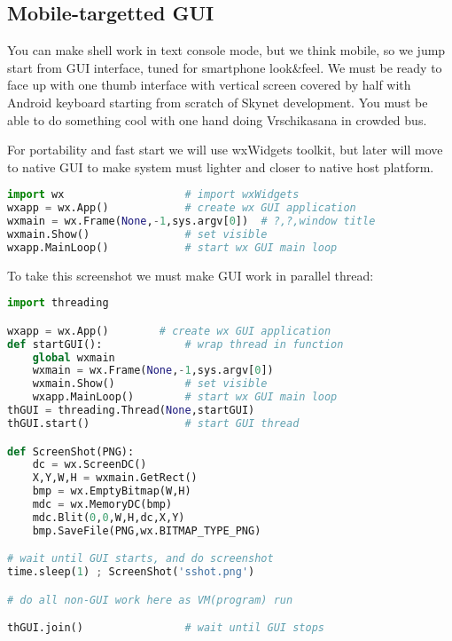 \clearpage
\subsection{Mobile-targetted GUI}
You can make shell work in text console mode, but we think mobile, so we jump
start from GUI interface, tuned for smartphone look\&feel. We must be ready to
face up with one thumb interface with vertical screen covered by half
with Android keyboard starting from scratch of Skynet development. You must be
able to do something cool with one hand doing Vrschikasana in crowded bus.

For portability and fast start we will use wxWidgets toolkit, but later will
move to native GUI to make system must lighter and closer to native host
platform.

\begin{lstlisting}[language=python]
import wx					# import wxWidgets
wxapp = wx.App()			# create wx GUI application
wxmain = wx.Frame(None,-1,sys.argv[0])	# ?,?,window title
wxmain.Show()				# set visible
wxapp.MainLoop()			# start wx GUI main loop
\end{lstlisting}


To take this screenshot we must make GUI work in parallel thread:
\begin{lstlisting}[language=python]
import threading

wxapp = wx.App()		# create wx GUI application
def startGUI():				# wrap thread in function
	global wxmain
	wxmain = wx.Frame(None,-1,sys.argv[0])
	wxmain.Show()			# set visible
	wxapp.MainLoop()		# start wx GUI main loop
thGUI = threading.Thread(None,startGUI)
thGUI.start()				# start GUI thread

def ScreenShot(PNG):
	dc = wx.ScreenDC()
	X,Y,W,H = wxmain.GetRect()
	bmp = wx.EmptyBitmap(W,H)
	mdc = wx.MemoryDC(bmp)
	mdc.Blit(0,0,W,H,dc,X,Y)
	bmp.SaveFile(PNG,wx.BITMAP_TYPE_PNG)

# wait until GUI starts, and do screenshot
time.sleep(1) ; ScreenShot('sshot.png')

# do all non-GUI work here as VM(program) run

thGUI.join()				# wait until GUI stops
\end{lstlisting}

